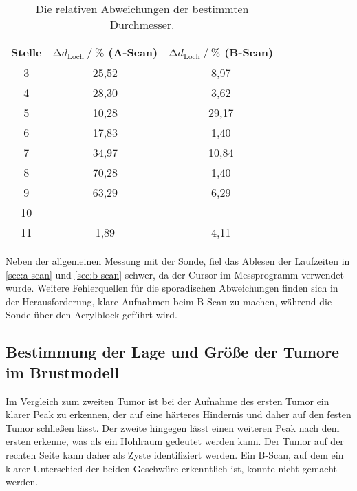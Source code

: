 \begin{table}
    \centering
    \caption{Die relativen Abweichungen der bestimmten Durchmesser.}
    \label{tab:abw}
    \begin{tabular}{c c c}
        \toprule
        Stelle &
        $\increment d_\text{Loch} \mathbin{/} \%$ (A-Scan) &
        $\increment d_\text{Loch} \mathbin{/} \%$ (B-Scan) \\
        \midrule
         3 &  25,52 &                   8,97 \\
         4 &  28,30 &                   3,62 \\
         5 &  10,28 &                  29,17 \\
         6 &  17,83 &                   1,40 \\
         7 &  34,97 &                  10,84 \\
         8 &  70,28 &                   1,40 \\
         9 &  63,29 &                   6,29 \\
         10 &       &                        \\
         11 &  1,89 &                   4,11 \\
        \bottomrule
    \end{tabular} 
\end{table}

Neben der allgemeinen Messung mit der Sonde, fiel das Ablesen der Laufzeiten in \autoref{sec:a-scan} und \autoref{sec:b-scan} schwer,
da der Cursor im Messprogramm verwendet wurde.  
Weitere Fehlerquellen für die sporadischen Abweichungen finden sich in der Herausforderung, klare Aufnahmen beim B-Scan zu machen, 
während die Sonde über den Acrylblock geführt wird.


\subsection{Bestimmung der Lage und Größe der Tumore im Brustmodell}

Im Vergleich zum zweiten Tumor ist bei der Aufnahme des ersten Tumor ein klarer Peak zu erkennen, 
der auf eine härteres Hindernis und daher auf den festen Tumor schließen lässt.
Der zweite hingegen lässt einen weiteren Peak nach dem ersten erkenne, was als ein Hohlraum gedeutet werden kann.
Der Tumor auf der rechten Seite kann daher als Zyste identifiziert werden.
Ein B-Scan, auf dem ein klarer Unterschied der beiden Geschwüre erkenntlich ist, konnte nicht gemacht werden.